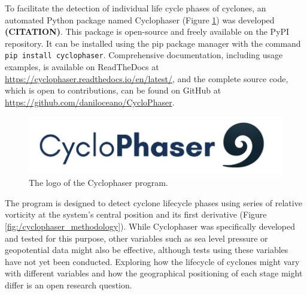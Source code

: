 To facilitate the detection of individual life cycle phases of cyclones, an automated Python package named Cyclophaser (Figure \ref{fig:cyclophaser_logo}) was developed \textbf{(CITATION)}. This package is open-source and freely available on the PyPI repository. It can be installed using the pip package manager with the command \texttt{pip install cyclophaser}. Comprehensive documentation, including usage examples, is available on ReadTheDocs at \url{https://cyclophaser.readthedocs.io/en/latest/}, and the complete source code, which is open to contributions, can be found on GitHub at \url{https://github.com/daniloceano/CycloPhaser}.

\begin{figure}[h]
\centering
\includegraphics[width=\linewidth]{figs_3/cyclophaser.png}
\caption[Cyclophaser - logo]{The logo of the Cyclophaser program.}
\label{fig:cyclophaser_logo}
\end{figure}

The program is designed to detect cyclone lifecycle phases using series of relative vorticity at the system's central position and its first derivative (Figure \ref{fig:/cyclophaser_methodology}). While Cyclophaser was specifically developed and tested for this purpose, other variables such as sea level pressure or geopotential data might also be effective, although tests using these variables have not yet been conducted. Exploring how the lifecycle of cyclones might vary with different variables and how the geographical positioning of each stage might differ is an open research question.

